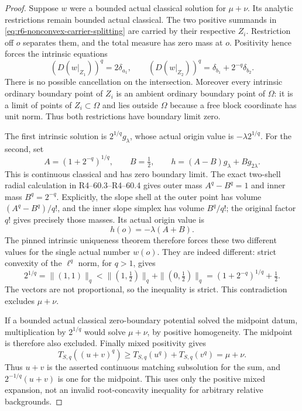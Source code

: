 \documentclass[11pt,a4paper]{article}
\numberwithin{equation}{section}
\theoremstyle{definition}
\theoremstyle{remark}
\begin{document}
\begin{proof}
Suppose $w$ were a bounded actual classical solution for $\mu+\nu$.
Its analytic restrictions remain bounded actual classical. The two
positive summands in \eqref{eq:r6-nonconvex-carrier-splitting} are
carried by their respective $Z_i$. Restriction off $o$ separates
them, and the total measure has zero mass at $o$. Positivity hence
forces the intrinsic equations
\[
        (D(w|_{Z_1}))^q=2\delta_{a_1},\qquad
        (D(w|_{Z_2}))^q=\delta_{b_1}+2^{-q}\delta_{b_2}.
\]
There is no possible cancellation on the intersection. Moreover
every intrinsic ordinary boundary point of $Z_i$ is an ambient
ordinary boundary point of $\Omega$: it is a limit of points of
$Z_i\subset\Omega$ and lies outside $\Omega$ because a free block
coordinate has unit norm. Thus both restrictions have boundary
limit zero.

The first intrinsic solution is $2^{1/q}g_\lambda$, whose actual
origin value is $-\lambda2^{1/q}$. For the second, set
\[
          A=(1+2^{-q})^{1/q},\qquad B=\tfrac12,
          \qquad h=(A-B)g_\lambda+B g_{2\lambda}.
\]
This is continuous classical and has zero boundary limit. The exact
two-shell radial calculation in
\textup{R4--60.3}--\textup{R4--60.4}
gives outer mass $A^q-B^q=1$ and inner mass $B^q=2^{-q}$.
Explicitly, the slope shell at the outer point has volume
$(A^q-B^q)/q!$, and the inner slope simplex has volume $B^q/q!$;
the original factor $q!$ gives precisely those masses. Its actual
origin value is
\[
                         h(o)=-\lambda(A+B).
\]
The pinned intrinsic uniqueness theorem therefore forces these
two different values for the single actual number $w(o)$.
They are indeed different: strict convexity of the $\ell^q$ norm,
for $q>1$, gives
\[
 2^{1/q}=\|(1,1)\|_q
      <\|(1,\tfrac12)\|_q+\|(0,\tfrac12)\|_q
      =(1+2^{-q})^{1/q}+\tfrac12.
\]
The vectors are not proportional, so the inequality is strict.
This contradiction excludes $\mu+\nu$.

If a bounded actual classical zero-boundary potential solved the
midpoint datum, multiplication by $2^{1/q}$ would solve $\mu+\nu$,
by positive homogeneity. The midpoint is therefore also excluded.
Finally mixed positivity gives
\[
            T_{S,q}((u+v)^q)\ge T_{S,q}(u^q)+T_{S,q}(v^q)
                                      =\mu+\nu.
\]
Thus $u+v$ is the asserted continuous matching subsolution for the
sum, and $2^{-1/q}(u+v)$ is one for the midpoint. This uses only
the positive mixed expansion, not an invalid root-concavity
inequality for arbitrary relative backgrounds.
\end{proof}
\end{document}

